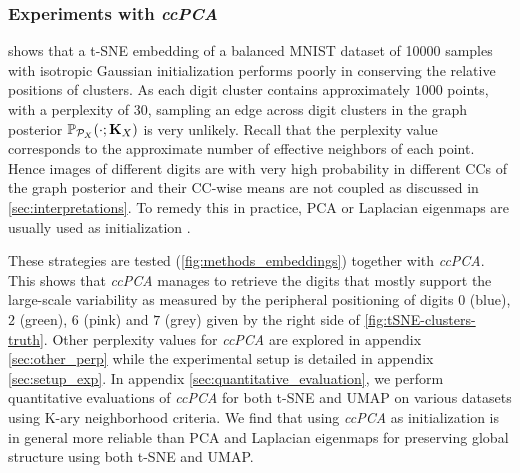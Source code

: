 \subsubsection{Experiments with \textit{ccPCA}}\label{sec:ccPCA}


 shows that a t-SNE embedding of a balanced MNIST dataset of 10000 samples \citep{deng2012mnist} with isotropic Gaussian initialization performs poorly in conserving the relative positions of clusters. As each digit cluster contains approximately $1000$ points, with a perplexity of $30$, sampling an edge across digit clusters in the graph posterior $\mathbb{P}_{\mathcal{P}_X}(\cdot;\mathbf{K}_{X})$ is very unlikely. Recall that the perplexity value \citep{maaten2008tSNE} corresponds to the approximate number of effective neighbors of each point. Hence images of different digits are with very high probability in different CCs of the graph posterior and their CC-wise means are not coupled as discussed in \cref{sec:interpretations}. To remedy this in practice, PCA or Laplacian eigenmaps are usually used as initialization \citep{kobak2021initialization}. 

These strategies are tested (\cref{fig:methods_embeddings}) together with \textit{ccPCA}. This shows that 
\textit{ccPCA} manages to retrieve the digits that mostly support the large-scale variability as measured by the peripheral positioning of digits $0$ (blue), $2$ (green), $6$ (pink) and $7$ (grey) given by the right side of \cref{fig:tSNE-clusters-truth}. Other perplexity values for \textit{ccPCA} are explored in appendix \ref{sec:other_perp} while the experimental setup is detailed in appendix \ref{sec:setup_exp}. In appendix \ref{sec:quantitative_evaluation}, we perform quantitative evaluations of \textit{ccPCA} for both t-SNE and UMAP on various datasets using K-ary neighborhood criteria. We find that using \textit{ccPCA} as initialization is in general more reliable than PCA and Laplacian eigenmaps for preserving global structure using both t-SNE and UMAP. 

